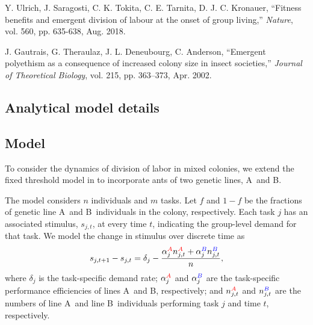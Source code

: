 \documentclass[11pt]{article}
\newcommand{\A}{{\color{red}A}}
\newcommand{\B}{{\color{blue}B}}
\begin{document}
\begin{thebibliography}{99}

 Y. Ulrich, J. Saragosti, C. K. Tokita, C. E. Tarnita, D. J. C. Kronauer, ``Fitness benefits and emergent division of labour at the onset of group living,'' \textit{Nature}, vol. 560, pp. 635-638, Aug. 2018.

 J. Gautrais, G. Theraulaz, J. L. Deneubourg, C. Anderson, ``Emergent polyethism as a consequence of increased colony size in insect societies,'' \textit{Journal of Theoretical Biology}, vol. 215, pp. 363–373, Apr. 2002.

\end{thebibliography}
\newpage
\begin{appendices}

\section{Analytical model details} \label{sec:appendix}

\subsection{Model} \label{sec:model}

To consider the dynamics of division of labor in mixed colonies, we extend the fixed threshold model in \cite{ulrich18} to incorporate ants of two genetic lines, \A\ and \B. 

The model considers $n$ individuals and $m$ tasks. 
Let $f$ and $1-f$ be the fractions of genetic line \A\ and \B\ individuals in the colony, respectively.
Each task $j$ has an associated stimulus, $s_{j,t}$, at every time $t$, indicating the group-level demand for that task. We model the change in stimulus over discrete time as
\begin{equation}
    s_{j,t+1} - s_{j,t}  = \delta_j - \frac{\alpha_j^{\A} n_{j,t}^{\A} + \alpha_j^{\B} n_{j,t}^{\B} }{n}, \label{eq:stim}
\end{equation}
where $\delta_j$ is the task-specific demand rate; $\alpha_j^{\A}$ and $\alpha_j^{\B}$ are the task-specific performance efficiencies of lines \A\ and \B, respectively; and $n_{j,t}^{\A}$ and $n_{j,t}^{\B}$ are the numbers of line \A\ and line \B\ individuals performing task $j$ and time $t$, respectively.


\end{appendices}
\end{document}
